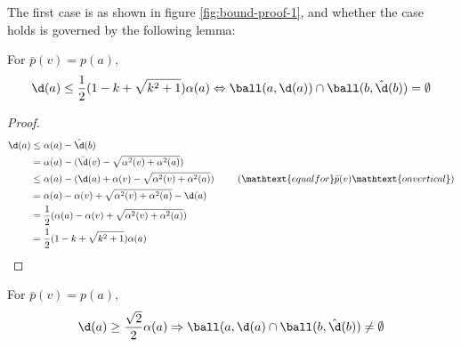 The first case is as shown in figure \ref{fig:bound-proof-1}, and whether the case holds is governed by the following lemma:

\begin{lemma}
For $\bar{p}(v) = p(a)$, 
\[
\d(a) \le \frac{1}{2}(1-k+\sqrt{k^2+1})\alpha(a) \Leftrightarrow \ball(a,\d(a)) \cap \ball(b,\hat{\d}(b)) = \emptyset
\]
\end{lemma}
\begin{proof}
\begin{alignat}{5}
\d(a) &\le \alpha(a)-\hat{\d}(b) \nonumber \\
        &= \alpha(a) - (\bar{\d}(v)-\sqrt{\alpha^2(v)+\alpha^2(a)}) \nonumber \\
        &\le \alpha(a) - (\d(a)+\alpha(v)-\sqrt{\alpha^2(v)+\alpha^2(a)}) & \hspace{5mm}(\mathtext{equal for } \bar{p}(v) \mathtext{ on vertical}) \nonumber \\
        &= \alpha(a)-\alpha(v)+\sqrt{\alpha^2(v)+\alpha^2(a)}-\d(a) \nonumber \\
        &= \frac{1}{2}(\alpha(a)-\alpha(v)+\sqrt{\alpha^2(v)+\alpha^2(a)}) \nonumber \\
        &= \frac{1}{2}(1-k+\sqrt{k^2+1})\alpha(a) 
\end{alignat}
\end{proof}


\begin{corollary}
For $\bar{p}(v) = p(a)$, 
\[
\d(a) \ge \frac{\sqrt{2}}{2}\alpha(a) \Rightarrow \ball(a,\d(a) \cap \ball(b,\hat{\d}(b)) \ne \emptyset 
\]
\end{corollary}

